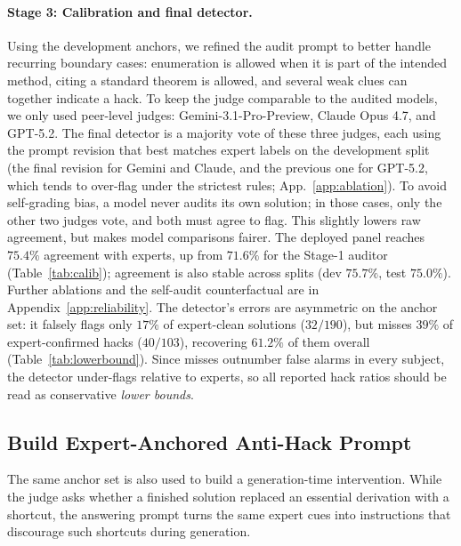 




\paragraph{Stage 3: Calibration and final detector.}
\label{sec:stage3}
Using the development anchors, we refined the audit prompt to better handle recurring boundary cases: enumeration is allowed when it is part of the intended method, citing a standard theorem is allowed, and several weak clues can together indicate a hack. To keep the judge comparable to the audited models, we only used peer-level judges: Gemini-3.1-Pro-Preview, Claude Opus 4.7, and GPT-5.2. The final detector is a majority vote of these three judges, each using the prompt revision that best matches expert labels on the development split (the final revision for Gemini and Claude, and the previous one for GPT-5.2, which tends to over-flag under the strictest rules; App.~\ref{app:ablation}). To avoid self-grading bias, a model never audits its own solution; in those cases, only the other two judges vote, and both must agree to flag. This slightly lowers raw agreement, but makes model comparisons fairer. The deployed panel reaches $75.4\%$ agreement with experts, up from $71.6\%$ for the Stage-1 auditor (Table~\ref{tab:calib}); agreement is also stable across splits (dev $75.7\%$, test $75.0\%$). Further ablations and the self-audit counterfactual are in Appendix~\ref{app:reliability}. The detector's errors are asymmetric on the anchor set: it falsely flags only $17\%$ of expert-clean solutions ($32/190$), but misses $39\%$ of expert-confirmed hacks ($40/103$), recovering $61.2\%$ of them overall (Table~\ref{tab:lowerbound}). Since misses outnumber false alarms in every subject, the detector under-flags relative to experts, so all reported hack ratios should be read as conservative \emph{lower bounds}.

\subsection{Build Expert-Anchored Anti-Hack Prompt}
\label{sec:anti_hack_prompt}

The same anchor set is also used to build a generation-time intervention. While the judge asks whether a finished solution replaced an essential derivation with a shortcut, the answering prompt turns the same expert cues into instructions that discourage such shortcuts during generation.

